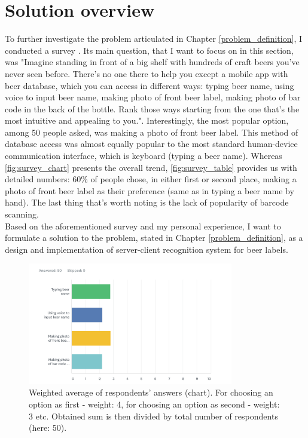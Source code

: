 \documentclass[11pt]{article}
\begin{document}
\section{Solution overview} \label{solution_overview}
To further investigate the problem articulated in Chapter \ref{problem_definition}, I conducted a survey \cite{survey}. Its main question, that I want to focus on in this section, was "Imagine standing in front of a big shelf with hundreds of craft beers you've never seen before. There's no one there to help you except a mobile app with beer database, which you can access in different ways: typing beer name, using voice to input beer name, making photo of front beer label, making photo of bar code in the back of the bottle. Rank those ways starting from the one that's the most intuitive and appealing to you.". Interestingly, the most popular option, among 50 people asked, was making a photo of front beer label. This method of database access was almost equally popular to the most standard human-device communication interface, which is keyboard (typing a beer name). Whereas \autoref{fig:survey_chart} presents the overall trend, \autoref{fig:survey_table} provides us with detailed numbers: 60\% of people chose, in either first or second place, making a photo of front beer label as their preference (same as in typing a beer name by hand). The last thing that's worth noting is the lack of popularity of barcode scanning.\\

Based on the aforementioned survey and my personal experience, I want to formulate a solution to the problem, stated in Chapter \ref{problem_definition}, as a design and implementation of server-client recognition system for beer labels.

\begin{figure}[h]
\includegraphics[width=0.8\textwidth]{survey_chart}
\centering
\caption{Weighted average of respondents' answers (chart). For choosing an option as first - weight: 4, for choosing an option as second - weight: 3 etc. Obtained sum is then divided by total number of respondents (here: 50).}
\label{fig:survey_chart}
\end{figure}
\end{document}
